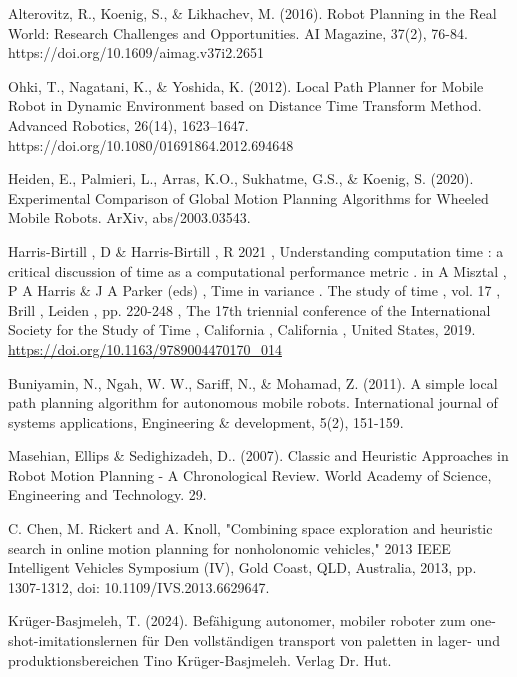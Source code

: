 \begin{thebibliography}{9}
Alterovitz, R., Koenig, S., \& Likhachev, M. (2016). Robot Planning in the Real World: Research Challenges and Opportunities. 
AI Magazine, 37(2), 76-84. https://doi.org/10.1609/aimag.v37i2.2651

Ohki, T., Nagatani, K., \& Yoshida, K. (2012). Local Path Planner for Mobile Robot in Dynamic Environment based on Distance 
Time Transform Method. Advanced Robotics, 26(14), 1623–1647. https://doi.org/10.1080/01691864.2012.694648

Heiden, E., Palmieri, L., Arras, K.O., Sukhatme, G.S., \& Koenig, S. (2020). Experimental Comparison of Global Motion 
Planning Algorithms for Wheeled Mobile Robots. ArXiv, abs/2003.03543.

Harris-Birtill , D \& Harris-Birtill , R 2021 , Understanding computation time : a critical discussion 
of time as a computational performance metric . in A Misztal , P A Harris \& J A Parker (eds) , 
Time in variance . The study of time , vol. 17 , Brill , Leiden , pp. 220-248 , The 17th triennial 
conference of the International Society for the Study of Time , California , California , 
United States, 2019. \url{https://doi.org/10.1163/9789004470170_014}

Buniyamin, N., Ngah, W. W., Sariff, N., \& Mohamad, Z. (2011). A simple local path planning algorithm 
for autonomous mobile robots. International journal of systems applications, Engineering \& development, 
5(2), 151-159.

Masehian, Ellips \& Sedighizadeh, D.. (2007). Classic and Heuristic Approaches in Robot Motion Planning - 
A Chronological Review. World Academy of Science, Engineering and Technology. 29. 

C. Chen, M. Rickert and A. Knoll, "Combining space exploration and heuristic search in online motion 
planning for nonholonomic vehicles," 2013 IEEE Intelligent Vehicles Symposium (IV), Gold Coast, QLD, 
Australia, 2013, pp. 1307-1312, doi: 10.1109/IVS.2013.6629647. 

Kr\"uger-Basjmeleh, T. (2024). Bef\"ahigung autonomer, mobiler roboter zum one-shot-imitationslernen f\"ur 
Den vollst\"andigen transport von paletten in lager- und produktionsbereichen Tino Kr\"uger-Basjmeleh. Verlag Dr. Hut.

\end{thebibliography}


